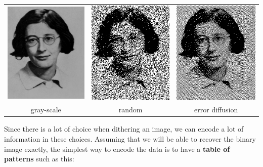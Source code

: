 \begin{tabular}{ccc}
	\includegraphics{i/psimone.png} &
	\href{z-psimone-random.png}{\includegraphics{psimone-random.png}} &
	\href{z-psimone-errdif.png}{\includegraphics{psimone-errdif.png}} \\
	gray-scale &
	random &
	error diffusion
\end{tabular}


Since there is a lot of choice when dithering an image, we can encode a lot
of information in these choices.  Assuming that we will be able to recover
the binary image exactly, the simplest way to encode the data is to have a
{\bf table of patterns} such as this:

